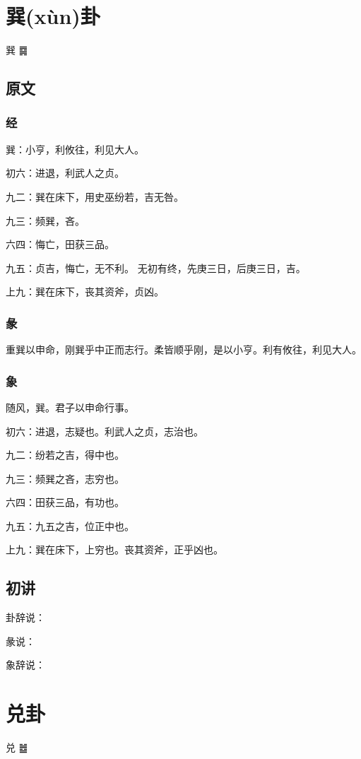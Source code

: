 \documentclass[12pt,oneside]{book}
\begin{document}
\chapter{巽(xùn)卦}
巽 {\Large ䷸}

\section{原文}

\subsection{经}
巽：小亨，利攸往，利见大人。

初六：进退，利武人之贞。

九二：巽在床下，用史巫纷若，吉无咎。

九三：频巽，吝。

六四：悔亡，田获三品。

九五：贞吉，悔亡，无不利。 无初有终，先庚三日，后庚三日，吉。

上九：巽在床下，丧其资斧，贞凶。

\subsection{彖}
重巽以申命，刚巽乎中正而志行。柔皆顺乎刚，是以小亨。利有攸往，利见大人。

\subsection{象}
随风，巽。君子以申命行事。

初六：进退，志疑也。利武人之贞，志治也。

九二：纷若之吉，得中也。

九三：频巽之吝，志穷也。

六四：田获三品，有功也。

九五：九五之吉，位正中也。

上九：巽在床下，上穷也。丧其资斧，正乎凶也。

\section{初讲}
卦辞说：

彖说：

象辞说：


\chapter{兑卦}
兑 {\Large ䷹}
\end{document}
